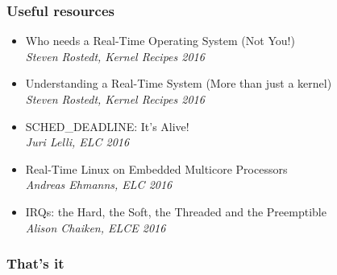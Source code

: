\documentclass{smilebeamer}
\begin{document}






\begin{frame}
	\frametitle{Useful resources}
	\begin{itemize}
		\item Who needs a Real-Time Operating System (Not You!) \\ {\small{\textit{Steven Rostedt, Kernel Recipes 2016}}}
			\vspace{0.2cm}
		\item Understanding a Real-Time System (More than just a kernel) \\ {\small{\textit{Steven Rostedt, Kernel Recipes 2016}}}
			\vspace{0.2cm}
		\item SCHED\_DEADLINE: It's Alive! \\ {\small{\textit{Juri Lelli, ELC 2016}}}
			\vspace{0.2cm}
		\item Real-Time Linux on Embedded Multicore Processors \\ {\small{\textit{Andreas Ehmanns, ELC 2016}}}
			\vspace{0.2cm}
		\item IRQs: the Hard, the Soft, the Threaded and the Preemptible \\ {\small{\textit{Alison Chaiken, ELCE 2016}}}
	\end{itemize}
\end{frame}

\begin{frame}
	\frametitle{That's it}
\end{frame}
\end{document}
